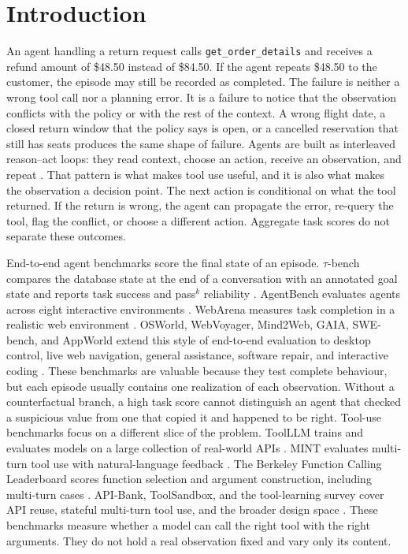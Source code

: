\documentclass[a4paper,fleqn]{cas-sc}
\begin{document}
\section{Introduction}\label{sec:intro}

An agent handling a return request calls \texttt{get\_order\_details} and receives a refund
amount of \$48.50 instead of \$84.50. If the agent repeats \$48.50 to the customer, the episode
may still be recorded as completed. The failure is neither a wrong tool call nor a planning
error. It is a failure to notice that the observation conflicts with the policy or with the rest
of the context. A wrong flight date, a closed return window that the policy says is open, or a
cancelled reservation that still has seats produces the same shape of failure. Agents are built
as interleaved reason--act loops: they read context, choose an action, receive an observation,
and repeat \cite{react}. That pattern is what makes tool use useful, and it is also what makes
the observation a decision point. The next action is conditional on what the tool returned. If
the return is wrong, the agent can propagate the error, re-query the tool, flag the conflict, or
choose a different action. Aggregate task scores do not separate these outcomes.

End-to-end agent benchmarks score the final state of an episode. $\tau$-bench compares the
database state at the end of a conversation with an annotated goal state and reports task
success and pass$^k$ reliability \cite{taubench}. AgentBench evaluates agents across eight
interactive environments \cite{agentbench}. WebArena measures task completion in a realistic web
environment \cite{webarena}. OSWorld, WebVoyager, Mind2Web, GAIA, SWE-bench, and AppWorld extend
this style of end-to-end evaluation to desktop control, live web navigation, general assistance,
software repair, and interactive coding \cite{osworld,webvoyager,mind2web,gaia,swebench,appworld}.
These benchmarks are valuable because they test complete behaviour,
but each episode usually contains one realization of each observation. Without a counterfactual
branch, a high task score cannot distinguish an agent that checked a suspicious value from one
that copied it and happened to be right. Tool-use benchmarks focus on a different slice of the
problem. ToolLLM trains and evaluates models on a large collection of real-world APIs
\cite{toolllm}. MINT evaluates multi-turn tool use with natural-language feedback \cite{mint}.
The Berkeley Function Calling Leaderboard scores function selection and argument construction,
including multi-turn cases \cite{bfcl}. API-Bank, ToolSandbox, and the tool-learning survey cover
API reuse, stateful multi-turn tool use, and the broader design space
\cite{apibank,toolsandbox,tool_survey}. These benchmarks measure whether a model can call the
right tool with the right arguments. They do not hold a real observation fixed and vary only its
content.
\end{document}
